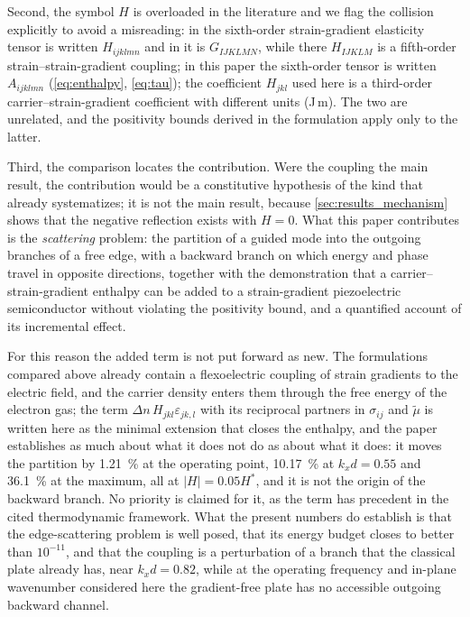 Second, the symbol $H$ is overloaded in the literature and we flag the collision
explicitly to avoid a misreading: in \cite{hu2025computational} the sixth-order strain-gradient elasticity tensor is written $H_{ijklmn}$ and in
\cite{qu2025thermodynamic} it is $G_{IJKLMN}$, while there $H_{IJKLM}$ is a fifth-order strain--strain-gradient
coupling; in this paper the sixth-order tensor is written $A_{ijklmn}$ (\cref{eq:enthalpy}, \cref{eq:tau});
the coefficient $H_{jkl}$ used here is a third-order carrier--strain-gradient
coefficient with different units (J\,m).  The two are unrelated, and the
positivity bounds derived in the formulation apply only to the latter.

Third, the comparison locates the contribution.  Were the coupling the main result, the contribution would be a constitutive hypothesis of the kind that \cite{qu2025thermodynamic} already systematizes; it is not the main result, because \cref{sec:results_mechanism} shows that the negative reflection exists with $H=0$.  What this paper contributes is the \emph{scattering} problem: the
partition of a guided mode into the outgoing branches of a free edge, with a
backward branch on which energy and phase travel in opposite directions, together with the demonstration that a carrier--strain-gradient enthalpy can be
added to a strain-gradient piezoelectric semiconductor without violating the
positivity bound, and a quantified account of its incremental effect.

For this reason the added term is not put forward as new.  The formulations
compared above already contain a flexoelectric coupling of strain gradients to the
electric field, and the carrier density enters them through the free energy of
the electron gas; the term $\Delta n\,H_{jkl}\varepsilon_{jk,l}$ with its
reciprocal partners in $\sigma_{ij}$ and $\widetilde\mu$ is written here as the
minimal extension that closes the enthalpy, and the paper establishes as much
about what it does not do as about what it does: it moves the partition by
\SI{1.21}{\percent} at the operating point, \SI{10.17}{\percent} at
$k_xd=0.55$ and \SI{36.1}{\percent} at the maximum, all at $|H|=0.05H^{*}$, and
it is not the origin of the backward branch.  No priority is claimed for it, as the term has precedent in the cited thermodynamic framework.  What the
present numbers do establish is that the edge-scattering problem is well posed,
that its energy budget closes to better than $10^{-11}$, and that the coupling is a perturbation of a branch that the classical plate already has, near $k_xd=0.82$, while at the operating frequency and in-plane wavenumber considered here the gradient-free plate has no accessible outgoing backward channel.

